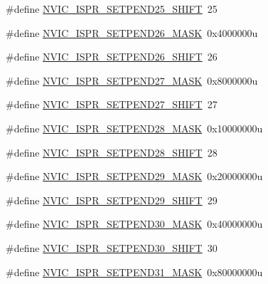 \begin{DoxyCompactItemize}
\item 
\#define \hyperlink{group___n_v_i_c___register___masks_ga57125bf077cd77ad80119637573bcd37}{N\+V\+I\+C\+\_\+\+I\+S\+P\+R\+\_\+\+S\+E\+T\+P\+E\+N\+D25\+\_\+\+S\+H\+I\+FT}~25
\item 
\#define \hyperlink{group___n_v_i_c___register___masks_ga40fddaab65a35bed51cb06d7320fd3bf}{N\+V\+I\+C\+\_\+\+I\+S\+P\+R\+\_\+\+S\+E\+T\+P\+E\+N\+D26\+\_\+\+M\+A\+SK}~0x4000000u
\item 
\#define \hyperlink{group___n_v_i_c___register___masks_gaaaba3f6dccbe5892f346640a02354e9e}{N\+V\+I\+C\+\_\+\+I\+S\+P\+R\+\_\+\+S\+E\+T\+P\+E\+N\+D26\+\_\+\+S\+H\+I\+FT}~26
\item 
\#define \hyperlink{group___n_v_i_c___register___masks_ga65bae3f03b9bc52bea2f31bde858579a}{N\+V\+I\+C\+\_\+\+I\+S\+P\+R\+\_\+\+S\+E\+T\+P\+E\+N\+D27\+\_\+\+M\+A\+SK}~0x8000000u
\item 
\#define \hyperlink{group___n_v_i_c___register___masks_ga7f7d1cb6d0529908a690578dee9b296e}{N\+V\+I\+C\+\_\+\+I\+S\+P\+R\+\_\+\+S\+E\+T\+P\+E\+N\+D27\+\_\+\+S\+H\+I\+FT}~27
\item 
\#define \hyperlink{group___n_v_i_c___register___masks_ga7943b19d13fdb76d9556da4ec2047b17}{N\+V\+I\+C\+\_\+\+I\+S\+P\+R\+\_\+\+S\+E\+T\+P\+E\+N\+D28\+\_\+\+M\+A\+SK}~0x10000000u
\item 
\#define \hyperlink{group___n_v_i_c___register___masks_ga8557751b3235fdfa36a6817fb926129f}{N\+V\+I\+C\+\_\+\+I\+S\+P\+R\+\_\+\+S\+E\+T\+P\+E\+N\+D28\+\_\+\+S\+H\+I\+FT}~28
\item 
\#define \hyperlink{group___n_v_i_c___register___masks_gaacf44c6ad67c8c2206fe5964d64e0ef3}{N\+V\+I\+C\+\_\+\+I\+S\+P\+R\+\_\+\+S\+E\+T\+P\+E\+N\+D29\+\_\+\+M\+A\+SK}~0x20000000u
\item 
\#define \hyperlink{group___n_v_i_c___register___masks_ga7479d0951ad39aa2098482407b20f043}{N\+V\+I\+C\+\_\+\+I\+S\+P\+R\+\_\+\+S\+E\+T\+P\+E\+N\+D29\+\_\+\+S\+H\+I\+FT}~29
\item 
\#define \hyperlink{group___n_v_i_c___register___masks_ga947ce830a4fd655af727600f0c64a3ef}{N\+V\+I\+C\+\_\+\+I\+S\+P\+R\+\_\+\+S\+E\+T\+P\+E\+N\+D30\+\_\+\+M\+A\+SK}~0x40000000u
\item 
\#define \hyperlink{group___n_v_i_c___register___masks_ga1e5fbceb1576045f6ebc0a6b9f443199}{N\+V\+I\+C\+\_\+\+I\+S\+P\+R\+\_\+\+S\+E\+T\+P\+E\+N\+D30\+\_\+\+S\+H\+I\+FT}~30
\item 
\#define \hyperlink{group___n_v_i_c___register___masks_ga05f82a22cce8445df3daf7058bb7ce9b}{N\+V\+I\+C\+\_\+\+I\+S\+P\+R\+\_\+\+S\+E\+T\+P\+E\+N\+D31\+\_\+\+M\+A\+SK}~0x80000000u

\end{DoxyCompactItemize}
